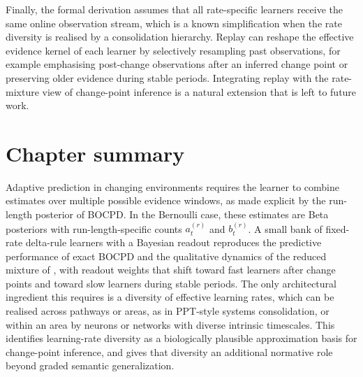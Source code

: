 Finally, the formal derivation assumes that all rate-specific learners receive the same online observation stream, which is a known simplification when the rate diversity is realised by a consolidation hierarchy. Replay can reshape the effective evidence kernel of each learner by selectively resampling past observations, for example emphasising post-change observations after an inferred change point or preserving older evidence during stable periods. Integrating replay with the rate-mixture view of change-point inference is a natural extension that is left to future work.

\section{Chapter summary}

Adaptive prediction in changing environments requires the learner to combine estimates over multiple possible evidence windows, as made explicit by the run-length posterior of BOCPD. In the Bernoulli case, these estimates are Beta posteriors with run-length-specific counts $a_t^{(r)}$ and $b_t^{(r)}$. A small bank of fixed-rate delta-rule learners with a Bayesian readout reproduces the predictive performance of exact BOCPD and the qualitative dynamics of the reduced mixture of \citet{Wilson2013}, with readout weights that shift toward fast learners after change points and toward slow learners during stable periods. The only architectural ingredient this requires is a diversity of effective learning rates, which can be realised across pathways or areas, as in PPT-style systems consolidation, or within an area by neurons or networks with diverse intrinsic timescales. This identifies learning-rate diversity as a biologically plausible approximation basis for change-point inference, and gives that diversity an additional normative role beyond graded semantic generalization.
